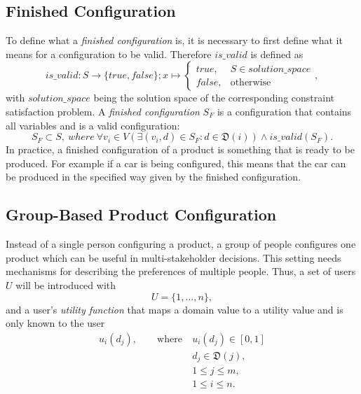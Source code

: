 \subsection{Finished Configuration}
To define what a \emph{finished configuration} is, it is necessary to first define what it means for a configuration to be valid. Therefore $is\_valid$ is defined as
\begin{equation} \label{eq:Foundations:ProductConfiguration:IsValid}
    is\_valid : S \to \{true, false\}; x \mapsto 
    \begin{cases}
        true, & S \in solution\_space \\
        false, & \text{otherwise}
    \end{cases},
\end{equation}
with $solution\_space$ being the solution space of the corresponding constraint satisfaction problem. A \emph{finished configuration} $S_F$ is a configuration that contains all variables and is a valid configuration:
\begin{equation} \label{eq:Foundations:ProductConfiguration:FinishedConfiguration}
    S_F \subset S,\ where \ \forall v_i \in V (\exists (v_i, d) \in S_F : d \in \mathfrak{D}(i)) \land is\_valid(S_F).
\end{equation}
In practice, a finished configuration of a product is something that is ready to be produced. For example if a car is being configured, this means that the car can be produced in the specified way given by the finished configuration.


\subsection{Group-Based Product Configuration}
\label{sec:Foundations:GroupBasedProductConfiguration}

Instead of a single person configuring a product, a group of people configures one product which can be useful in multi-stakeholder decisions. This setting needs mechanisms for describing the preferences of multiple people. Thus, a set of users $U$ will be introduced with
\begin{equation}\label{eq:Foundations:ProductConfiguration:Users}
    U = \{1, \dotsc, n\},
\end{equation}
and a user's \emph{utility function} that maps a domain value to a utility value and is only known to the user
\begin{equation}
    \begin{split}
        u_i(d_j), \qquad \text{where}\ & u_i(d_j) \in [0,1] \\
        & d_j \in  \mathfrak{D}(j),\\
        & 1 \leq j \leq m, \\
        & 1 \leq i \leq n.
    \end{split}
\end{equation}


